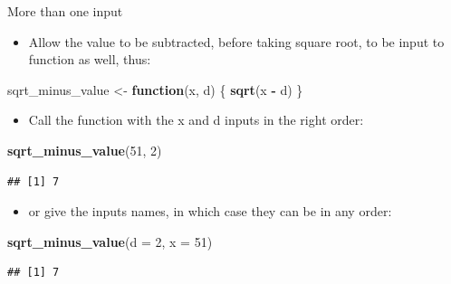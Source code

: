 \documentclass[ignorenonframetext,]{beamer}
\newenvironment{Shaded}{\begin{snugshade}}{\end{snugshade}}
\newcommand{\ControlFlowTok}[1]{\textcolor[rgb]{0.13,0.29,0.53}{\textbf{#1}}}
\newcommand{\DataTypeTok}[1]{\textcolor[rgb]{0.13,0.29,0.53}{#1}}
\newcommand{\DecValTok}[1]{\textcolor[rgb]{0.00,0.00,0.81}{#1}}
\newcommand{\KeywordTok}[1]{\textcolor[rgb]{0.13,0.29,0.53}{\textbf{#1}}}
\newcommand{\NormalTok}[1]{#1}
\newcommand{\OperatorTok}[1]{\textcolor[rgb]{0.81,0.36,0.00}{\textbf{#1}}}
\newcommand{\StringTok}[1]{\textcolor[rgb]{0.31,0.60,0.02}{#1}}
\providecommand{\tightlist}{%
  \setlength{\itemsep}{0pt}\setlength{\parskip}{0pt}}
\begin{document}
\begin{frame}[fragile]{More than one input}
\protect\hypertarget{more-than-one-input}{}

\begin{itemize}
\tightlist
\item
  Allow the value to be subtracted, before taking square root, to be
  input to function as well, thus:
\end{itemize}

\begin{Shaded}
\begin{Highlighting}[]
\NormalTok{sqrt_minus_value <-}\StringTok{ }\ControlFlowTok{function}\NormalTok{(x, d) \{}
  \KeywordTok{sqrt}\NormalTok{(x }\OperatorTok{-}\StringTok{ }\NormalTok{d)}
\NormalTok{\}}
\end{Highlighting}
\end{Shaded}

\begin{itemize}
\tightlist
\item
  Call the function with the x and d inputs in the right order:
\end{itemize}

\begin{Shaded}
\begin{Highlighting}[]
\KeywordTok{sqrt_minus_value}\NormalTok{(}\DecValTok{51}\NormalTok{, }\DecValTok{2}\NormalTok{)}
\end{Highlighting}
\end{Shaded}

\begin{verbatim}
## [1] 7
\end{verbatim}

\begin{itemize}
\tightlist
\item
  or give the inputs names, in which case they can be in any order:
\end{itemize}

\begin{Shaded}
\begin{Highlighting}[]
\KeywordTok{sqrt_minus_value}\NormalTok{(}\DataTypeTok{d =} \DecValTok{2}\NormalTok{, }\DataTypeTok{x =} \DecValTok{51}\NormalTok{)}
\end{Highlighting}
\end{Shaded}

\begin{verbatim}
## [1] 7
\end{verbatim}

\end{frame}
\end{document}
